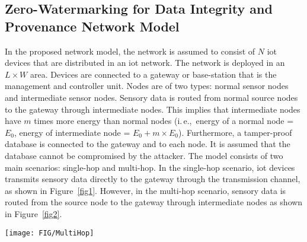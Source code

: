 \documentclass{llncs}
\newcommand{\ie}{i.\,e.,~}
\begin{document}
\subsection{Zero-Watermarking for Data Integrity and Provenance Network Model}
In the proposed network model, the network is assumed to consist of $N$ \gls*{iot} devices that are distributed in an \gls*{iot} network. The network is deployed in an $L \times W$ area. Devices are connected to a gateway or base-station that is the management and controller unit. Nodes are of two types: normal sensor nodes and intermediate sensor nodes. Sensory data is routed from normal source nodes to the gateway through intermediate nodes. This implies that intermediate nodes have $m$ times more energy than normal nodes (\ie energy of a normal node = $E_0$, energy of intermediate node = $E_0 + m \times E_0$). Furthermore, a tamper-proof database is connected to the gateway and to each node. It is assumed that the database cannot be compromised by the attacker. The model consists of two main scenarios: single-hop and multi-hop. In the single-hop scenario, \gls*{iot} devices transmits sensory data directly to the gateway through the transmission channel, as shown in Figure~\ref{fig1}. However, in the multi-hop scenario, sensory data is routed from the source node to the gateway through intermediate nodes as shown in Figure~\ref{fig2}. 





\begin{figure*}[!htbp]
\begin{center}
    \texttt{[image: FIG/MultiHop]}
\end{center}
\caption{Multi hop network model.}
\label{fig2}
\end{figure*}
\end{document}
